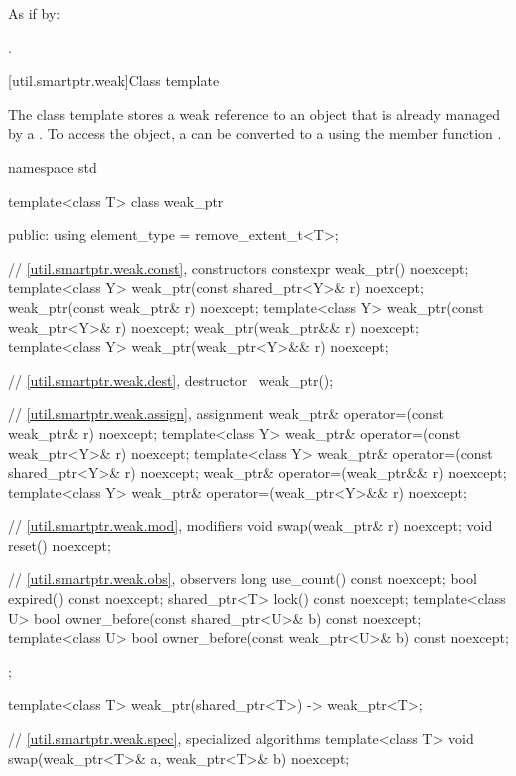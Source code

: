 \begin{itemdescr}
\pnum
\effects
As if by: 

\pnum
\returns
{}.
\end{itemdescr}

[util.smartptr.weak]{Class template }

\pnum
{}%
The  class template stores a weak reference to an object
that is already managed by a . To access the object, a
 can be converted to a  using the member
function .

\begin{codeblock}
namespace std {
  template<class T> class weak_ptr {
  public:
    using element_type = remove_extent_t<T>;

    // \ref{util.smartptr.weak.const}, constructors
    constexpr weak_ptr() noexcept;
    template<class Y>
      weak_ptr(const shared_ptr<Y>& r) noexcept;
    weak_ptr(const weak_ptr& r) noexcept;
    template<class Y>
      weak_ptr(const weak_ptr<Y>& r) noexcept;
    weak_ptr(weak_ptr&& r) noexcept;
    template<class Y>
      weak_ptr(weak_ptr<Y>&& r) noexcept;

    // \ref{util.smartptr.weak.dest}, destructor
    ~weak_ptr();

    // \ref{util.smartptr.weak.assign}, assignment
    weak_ptr& operator=(const weak_ptr& r) noexcept;
    template<class Y>
      weak_ptr& operator=(const weak_ptr<Y>& r) noexcept;
    template<class Y>
      weak_ptr& operator=(const shared_ptr<Y>& r) noexcept;
    weak_ptr& operator=(weak_ptr&& r) noexcept;
    template<class Y>
      weak_ptr& operator=(weak_ptr<Y>&& r) noexcept;

    // \ref{util.smartptr.weak.mod}, modifiers
    void swap(weak_ptr& r) noexcept;
    void reset() noexcept;

    // \ref{util.smartptr.weak.obs}, observers
    long use_count() const noexcept;
    bool expired() const noexcept;
    shared_ptr<T> lock() const noexcept;
    template<class U>
      bool owner_before(const shared_ptr<U>& b) const noexcept;
    template<class U>
      bool owner_before(const weak_ptr<U>& b) const noexcept;
  };

  template<class T>
    weak_ptr(shared_ptr<T>) -> weak_ptr<T>;

  // \ref{util.smartptr.weak.spec}, specialized algorithms
  template<class T>
    void swap(weak_ptr<T>& a, weak_ptr<T>& b) noexcept;
}
\end{codeblock}

